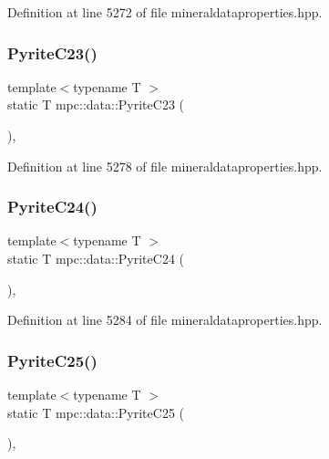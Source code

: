 Definition at line 5272 of file mineraldataproperties.\+hpp.

\mbox{\label{namespacempc_1_1data_a5c043aece5b6ab9fc5d8417c0e4a93e1}} 
\subsubsection{\texorpdfstring{Pyrite\+C23()}{PyriteC23()}}
{\footnotesize\ttfamily template$<$typename T $>$ \\
static T mpc\+::data\+::\+Pyrite\+C23 (\begin{DoxyParamCaption}{ }\end{DoxyParamCaption})\hspace{0.3cm}{\ttfamily [inline]}, {\ttfamily [static]}}



Definition at line 5278 of file mineraldataproperties.\+hpp.

\mbox{\label{namespacempc_1_1data_a3413d3add21dc22a49654e9b6cbd8870}} 
\subsubsection{\texorpdfstring{Pyrite\+C24()}{PyriteC24()}}
{\footnotesize\ttfamily template$<$typename T $>$ \\
static T mpc\+::data\+::\+Pyrite\+C24 (\begin{DoxyParamCaption}{ }\end{DoxyParamCaption})\hspace{0.3cm}{\ttfamily [inline]}, {\ttfamily [static]}}



Definition at line 5284 of file mineraldataproperties.\+hpp.

\mbox{\label{namespacempc_1_1data_a4e7e453486c3864d96595a971392322b}} 
\subsubsection{\texorpdfstring{Pyrite\+C25()}{PyriteC25()}}
{\footnotesize\ttfamily template$<$typename T $>$ \\
static T mpc\+::data\+::\+Pyrite\+C25 (\begin{DoxyParamCaption}{ }\end{DoxyParamCaption})\hspace{0.3cm}{\ttfamily [inline]}, {\ttfamily [static]}}



